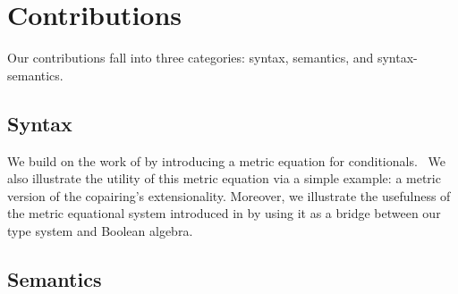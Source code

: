 




\section{Contributions}

Our contributions fall into three categories: syntax, semantics, and  syntax-semantics.

\subsection*{Syntax}

We build on the work of \cite{dahlqvist2023syntactic} by introducing a metric equation for conditionals.  We also illustrate the utility of this metric equation via a simple example: a metric version of the copairing's extensionality. 
Moreover, we illustrate the usefulness of the metric equational system introduced in \cite{dahlqvist2023syntactic} by using it as a bridge between our type system and Boolean algebra.


\subsection*{Semantics}

